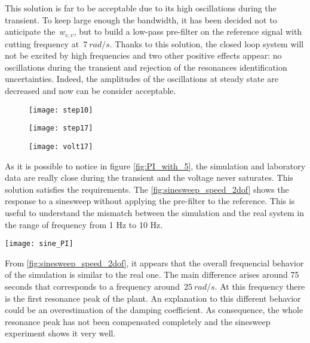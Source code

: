 This solution is far to be acceptable due to its high oscillations during the transient. To keep large enough the bandwidth, it has been decided not to anticipate the~$w_{c,v}$, but to build a low-pass pre-filter on the reference signal with cutting frequency at~$7\ rad/s$. Thanks to this solution, the closed loop system will not be excited by high frequencies and two other positive effects appear: no oscillations during the transient and rejection of the resonances identification uncertainties. Indeed, the amplitudes of the oscillations at steady state are decreased and now can be consider acceptable. 

\newpage
\begin{figure*}[h]
	\centering
\begin{subfigure}{0.4\columnwidth}
	\texttt{[image: step10]}
\end{subfigure}
\begin{subfigure}{0.4\columnwidth}
	\texttt{[image: step17]}
\end{subfigure}
\begin{subfigure}{0.4\columnwidth}
	\texttt{[image: volt17]}
\end{subfigure}
\caption{Speed control loop with $k_v=5$ with low-pass pre-filter}
\label{fig:PI_with_5}
\end{figure*}

As it is possible to notice in figure \ref{fig:PI_with_5}, the simulation and laboratory data are really close during the transient and the voltage never saturates. This solution satisfies the requirements. The \cref{fig:sinesweep_speed_2dof} shows the response to a sinesweep without applying the pre-filter to the reference.  This is useful to understand the mismatch between the simulation and the real system in the range of frequency from 1 Hz to 10 Hz.

\begin{figure*}[h]
	\centering
	\texttt{[image: sine\_PI]}
	\caption{Sineweep experiment from $1\ Hz$ to $10\ Hz$ in $100\ s$}
	\label{fig:sinesweep_speed_2dof}
\end{figure*}

From \cref{fig:sinesweep_speed_2dof}, it appears that the overall frequencial behavior of the simulation is similar to the real one. The main difference arises around 75 seconds that corresponds to a frequency around~$25\ rad/s$. At this frequency there is the first resonance peak of the plant. An explanation to this different behavior could be an overestimation of the damping coefficient. As consequence, the whole resonance peak has not been compensated completely and the sinesweep experiment shows it very well. \\

